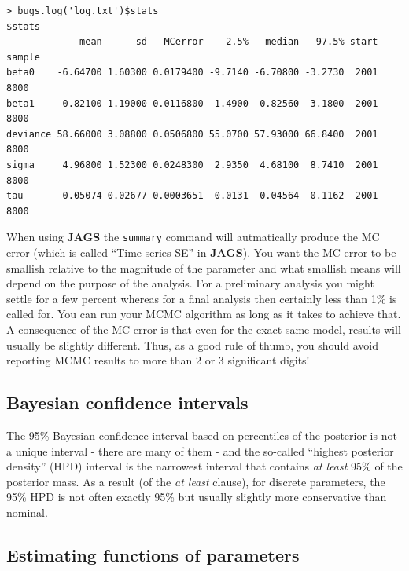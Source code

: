 {\small
\begin{verbatim}
> bugs.log('log.txt')$stats
$stats
             mean      sd   MCerror    2.5%   median   97.5% start sample
beta0    -6.64700 1.60300 0.0179400 -9.7140 -6.70800 -3.2730  2001   8000
beta1     0.82100 1.19000 0.0116800 -1.4900  0.82560  3.1800  2001   8000
deviance 58.66000 3.08800 0.0506800 55.0700 57.93000 66.8400  2001   8000
sigma     4.96800 1.52300 0.0248300  2.9350  4.68100  8.7410  2001   8000
tau       0.05074 0.02677 0.0003651  0.0131  0.04564  0.1162  2001   8000
\end{verbatim}
}
  When using {\bf JAGS} the \mbox{\tt summary} command will autmatically produce the MC error (which is called ``Time-series SE'' in {\bf
  JAGS}). You want the MC error to be smallish relative to the magnitude of
the parameter and what smallish means will depend on the purpose of
the analysis. For a preliminary analysis you might settle for a few
percent whereas for a final analysis then certainly less than 1\% is
called for. You can run your MCMC algorithm as long as it takes to
achieve that. A consequence of the MC error is that even for the exact
same model, results will usually be slightly different. Thus, as a good rule of
thumb, you should avoid reporting MCMC results to more than 2 or 3
significant digits!

\subsection{Bayesian confidence intervals}

The 95\% Bayesian confidence interval based on percentiles of the
posterior is not a unique interval - there are many of them - and the
so-called ``highest posterior density'' (HPD) interval is the
narrowest interval that contains {\it at least} 95\% of the posterior
mass.  As a result (of the {\it at least} clause), for discrete
parameters, the 95\% HPD is not often exactly 95\% but usually
slightly more conservative than nominal.

\subsection{Estimating functions of parameters}

